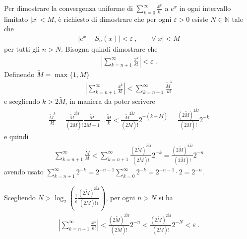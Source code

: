 \documentclass[letterpaper,10pt,italian]{jupyterBook}
\begin{document}
\sphinxAtStartPar
Per dimostrare la convergenza uniforme di \(\sum_{k=0}^{\infty} \frac{x^k}{k!}\) a \(e^x\) in ogni intervallo limitato \(|x| < M\), è richiesto di dimostrare che per ogni \(\varepsilon > 0\) esiste \(N \in \mathbb{N}\) tale che
\begin{equation*}
\begin{split}|e^x - S_n(x)| < \varepsilon \ , \qquad \forall |x| < M \end{split}
\end{equation*}
\sphinxAtStartPar
per tutti gli \(n > N\). Bisogna quindi dimostrare che
\begin{equation*}
\begin{split}\left| \sum_{k=n+1}^{\infty} \frac{x^k}{k!} \right| < \varepsilon \ .\end{split}
\end{equation*}
\sphinxAtStartPar
Definendo \(\tilde{M} = \max\{ 1, M \}\)
\begin{equation*}
\begin{split}\left| \sum_{k=n+1}^{\infty} \frac{x^k}{k!} \right| < \sum_{k=n+1}^{\infty} \frac{\tilde{M}^k}{k!}\end{split}
\end{equation*}
\sphinxAtStartPar
e scegliendo \(k > 2 \tilde{M}\), in maniera da poter scrivere
\begin{equation*}
\begin{split}\frac{\tilde{M}^k}{k!} = \frac{\tilde{M}^{2 \tilde{M}}}{( 2 \tilde{M})!} \frac{\tilde{M}}{2\tilde{M}+1} \dots \frac{\tilde{M}}{k} <  \frac{\tilde{M}^{2 \tilde{M}}}{( 2 \tilde{M})!} 2^{-(k - \tilde{M})} = \frac{(2 \tilde{M})^{2 \tilde{M}}}{(2 \tilde{M})!} 2^{-k}\end{split}
\end{equation*}
\sphinxAtStartPar
e quindi
\begin{equation*}
\begin{split}\sum_{k=n+1}^{\infty} \frac{\tilde{M}}{k!} < \sum_{k=n+1}^{\infty} \frac{(2 \tilde{M})^{2 \tilde{M}}}{(2\tilde{M})!} 2^{-k} =  \frac{(2 \tilde{M})^{2 \tilde{M}}}{(2\tilde{M})!} 2^{-n}\end{split}
\end{equation*}
\sphinxAtStartPar
avendo usato \(\sum_{k=n+1}^{\infty} 2^{-k} = 2^{-n-1} \sum_{k=0}^{\infty} 2^{-k} = 2^{-n-1} \cdot 2 = 2^{-n}\).

\sphinxAtStartPar
Scegliendo \(N > \log_2 \left( \frac{1}{\varepsilon} \frac{(2\tilde{M})^{2 \tilde{M}}}{(2 \tilde{M})!)} \right)\), per ogni \(n > N\) si ha
\begin{equation*}
\begin{split}\left| \sum_{k=n+1}^{\infty} \frac{x^k}{k!} \right| <  \frac{(2 \tilde{M})^{2 \tilde{M}}}{(2\tilde{M})!} 2^{-n} <  \frac{(2 \tilde{M})^{2 \tilde{M}}}{(2\tilde{M})!} 2^{-N} < \varepsilon \ .\end{split}
\end{equation*}\label{\detokenize{ch/exponential_logarithm-proof:math-hs-exp-log-proof-equivalence}}
\end{document}
